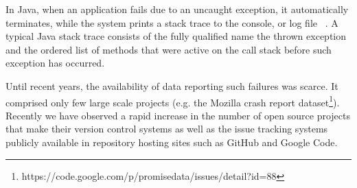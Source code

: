 \documentclass[conference]{IEEEtran}
\begin{document}



In Java, when an application fails due to an uncaught exception, 
it automatically terminates, while the system prints a stack trace to the console, 
or log file ~\cite{gosling2000java}.  A typical Java stack trace consists of  the fully qualified name 
the thrown exception and the ordered list of methods that were active on the call stack before 
such exception has occurred.




Until recent years, the availability of data reporting such failures was scarce. It comprised only few large scale projects (e.g. the Mozilla
crash report dataset\footnote{https://code.google.com/p/promisedata/issues/detail?id=88}).
Recently we have observed a rapid increase in the number of open
source projects that make their version control systems as well as the issue tracking systems
publicly available in repository hosting sites such as GitHub and Google Code.
\end{document}
